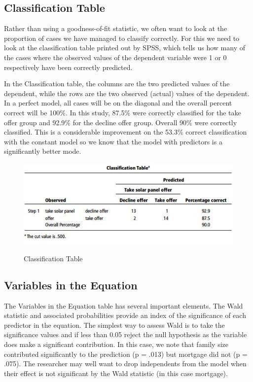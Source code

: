 \documentclass[a4paper,12pt]{article}
\begin{document}
\subsection{Classification Table}
Rather than using a goodness-of-fit statistic, we often want to look at the proportion of cases we have managed to classify correctly. For this we need to look at the classification table printed out by SPSS, which tells us how many of the cases where the observed values of the dependent variable were 1 or 0 respectively have
been correctly predicted.

In the Classification table, the columns are the two predicted values of the dependent, while the rows are the two observed (actual) values of the dependent. In a perfect model, all cases will be on the diagonal and the
overall percent correct will be 100\%. In this study, 87.5\% were correctly classified for the take offer group and 92.9\% for the decline offer group. Overall 90\% were correctly classified. This is a considerable improvement on the 53.3\% correct classification with the constant model so we know that the model with predictors is a significantly better mode.
\begin{figure}[h!]
\begin{center}
  \includegraphics[scale=0.6]{images/Logistic7}\\
  \caption{Classification Table}
\end{center}
\end{figure}

\subsection{Variables in the Equation}
The Variables in the Equation table has several important elements. The Wald statistic and associated probabilities provide an index of the significance of each predictor in the equation.
The simplest way to assess Wald is to take the significance values and if less
than 0.05 reject the null hypothesis as the variable does make a significant contribution.
In this case, we note that family size contributed significantly to the prediction
(p = .013) but mortgage did not (p = .075). The researcher may well want to drop
independents from the model when their effect is not significant by the Wald statistic
(in this case mortgage).
\end{document}
